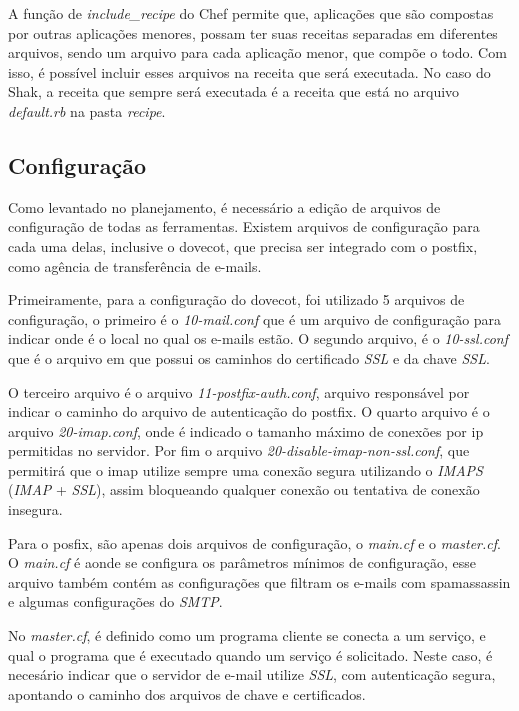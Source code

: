A função de \textit{include\_recipe} do Chef permite que, aplicações que são compostas
por outras aplicações menores, possam ter suas receitas separadas em diferentes arquivos,
sendo um arquivo para cada aplicação menor, que compõe o todo. Com isso, é possível 
incluir esses arquivos na receita que será executada. No caso do Shak, a receita
que sempre será executada é a receita que está no arquivo \textit{default.rb} na
pasta \textit{recipe}.

\subsection{Configuração}

Como levantado no planejamento, é necessário a edição de arquivos de configuração
de todas as ferramentas. Existem arquivos de configuração para cada uma delas, inclusive
o dovecot, que precisa ser integrado com o postfix, como agência de transferência
de e-mails.

Primeiramente, para a configuração do dovecot, foi utilizado 5 arquivos
de configuração, o primeiro é o \textit{10-mail.conf} que é um arquivo de configuração para
indicar onde é o local no qual os e-mails estão. O segundo arquivo, é o \textit{10-ssl.conf}
que é o arquivo em que possui os caminhos do certificado \textit{SSL} e da chave \textit{SSL}.

O terceiro arquivo é o arquivo \textit{11-postfix-auth.conf}, arquivo responsável por 
indicar o caminho do arquivo de autenticação
do postfix. O quarto arquivo é o arquivo \textit{20-imap.conf}, onde é indicado o tamanho
máximo de conexões por ip permitidas no servidor. Por fim o arquivo
\textit{20-disable-imap-non-ssl.conf}, que permitirá que o imap utilize sempre uma conexão
segura utilizando o \textit{IMAPS} (\textit{IMAP} + \textit{SSL}), assim bloqueando 
qualquer conexão ou tentativa de conexão insegura.

Para o posfix, são apenas dois arquivos de configuração, o \textit{main.cf} e o 
\textit{master.cf}.
O \textit{main.cf} é aonde se configura os parâmetros mínimos de configuração, esse arquivo
também contém as configurações que filtram os e-mails com spamassassin e 
algumas configurações do \textit{SMTP}. 

No \textit{master.cf}, é definido como um programa cliente se conecta a um serviço, e qual o
programa que é executado quando um serviço é solicitado. Neste caso, é necesário
indicar que o servidor de e-mail utilize \textit{SSL}, com autenticação segura, 
apontando o caminho dos arquivos de chave e certificados.

